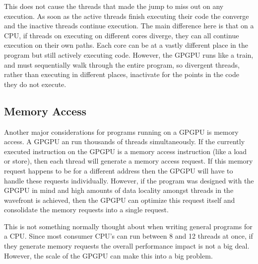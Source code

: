 This does not cause the threads that made the jump to miss out on any execution. As soon as the active threads finish executing their code the converge and the inactive threads continue execution. The main difference here is that on a CPU, if threads on executing on different cores diverge, they can all continue execution on their own paths. Each core can be at a vastly different place in the program but still actively executing code. However, the GPGPU runs like a train, and must sequentially walk through the entire program, so divergent threads, rather than executing in different places, inactivate for the points in the code they do not execute. \cite{memcached}

\subsection*{Memory Access}

Another major considerations for programs running on a GPGPU is memory access. A GPGPU an run thousands of threads simultaneously. If the currently executed instruction on the GPGPU is a memory access instruction (like a load or store), then each thread will generate a memory access request. If this memory request happens to be for a different address then the GPGPU will have to handle these requests individually. However, if the program was designed with the GPGPU in mind and high amounts of data locality amongst threads in the wavefront is achieved, then the GPGPU can optimize this request itself and consolidate the memory requests into a single request.

This is not something normally thought about when writing general programs for a CPU. Since most consumer CPU's can run between 8 and 12 threads at once, if they generate memory requests the overall performance impact is not a big deal. However, the scale of the GPGPU can make this into a big problem. \cite{memcached}



















